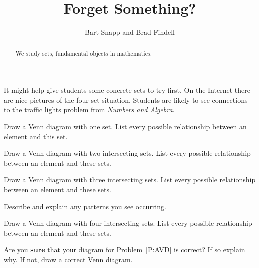 \documentclass[nooutcomes]{ximera}
\title{Forget Something?}
\author{Bart Snapp and Brad Findell}
\begin{document}
\begin{abstract}
  We study sets, fundamental objects in mathematics.
\end{abstract}
\maketitle


\begin{teachingnote}
It might help give students some concrete sets to try first.  On the Internet there are nice pictures of the four-set situation. Students are likely to see connections to the traffic lights problem from \emph{Numbers and Algebra}.
\end{teachingnote}

\begin{problem} 
Draw a Venn diagram with one set. List every possible relationship
between an element and this set. 
\end{problem}

\begin{problem} 
Draw a Venn diagram with two intersecting sets. List every possible
relationship between an element and these sets.
\end{problem}


\begin{problem} 
Draw a Venn diagram with three intersecting sets. List every possible
relationship between an element and these sets.
\end{problem}

\begin{problem}
Describe and explain any patterns you see occurring.
\end{problem}

\begin{problem}\label{P:AVD}
Draw a Venn diagram with four intersecting sets. List every possible
relationship between an element and these sets.
\end{problem}

\begin{problem}
Are you \textbf{sure} that your diagram for Problem~\ref{P:AVD} is
correct? If so explain why. If not, draw a correct Venn diagram.
\end{problem}
\end{document}

